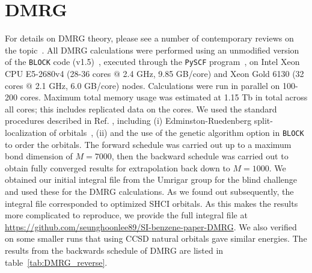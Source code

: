 \documentclass[journal=jcp,manuscript=suppinfo]{achemso}
\begin{document}
\section{DMRG}

For details on DMRG theory, please see a number of contemporary reviews on the topic~\cite{chan_dmrg_2011,wouters_dmrg_2014,knecht_dmrg_2016}. All DMRG calculations were performed using an unmodified version of the {\texttt{BLOCK}} code (v1.5)~\cite{chan_head_gordon_dmrg_jcp_2002,chan_dmrg_jcp_2004,chan_polyacetylenes_jcp_2008,sharma_chan_dmrg_2012,chan_dmrg_2015}, executed through the {\texttt{PySCF}} program~\cite{pyscf_prog,pyscf_paper,pyscf_arxiv_2020}, on Intel Xeon CPU E5-2680v4 (28-36 cores $@$ 2.4 GHz, 9.85 GB/core) and Xeon Gold 6130 (32 cores $@$ 2.1 GHz, 6.0 GB/core) nodes. Calculations were run in parallel on 100-200 cores. Maximum total memory usage was estimated at 1.15 Tb in total across all cores; this includes
replicated data on the cores. We used the standard procedures described in Ref. , including (i) Edminston-Ruedenberg split-localization of orbitals~\cite{edmiston_ruedenberg_rev_mod_phys_1963}, (ii) and the use of the genetic algorithm option in \texttt{BLOCK} to order the orbitals. The forward schedule was carried out up to a maximum bond dimension of $M=7000$, then the backward schedule was carried out to obtain fully converged results for extrapolation back down to $M=1000$.
We obtained our initial integral file from the Umrigar group for the blind challenge and used these for the DMRG calculations.
As we found out subsequently, the integral file corresponded to optimized SHCI orbitals. As this makes the results more complicated to reproduce,
we provide the full integral file at \url{https://github.com/seunghoonlee89/SI-benzene-paper-DMRG}. We also
verified on some smaller runs that using CCSD natural orbitals gave similar energies. The results from the backwards schedule of DMRG are listed in table~\ref{tab:DMRG_reverse}.\\
\end{document}

